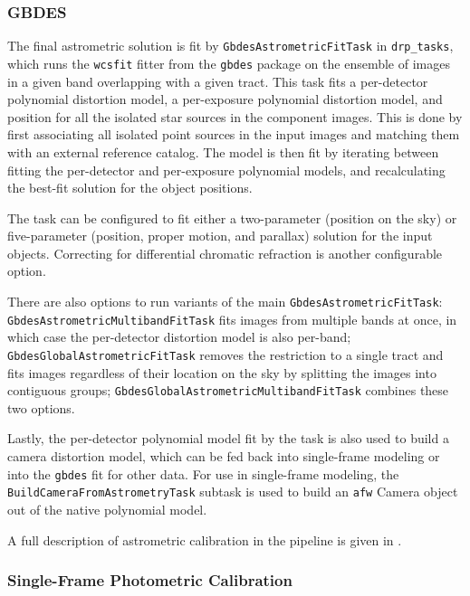 \subsubsection{GBDES}
\label{sec:gbdes}

The final astrometric solution is fit by \texttt{GbdesAstrometricFitTask} in \texttt{drp\_tasks}, which runs the \texttt{wcsfit} fitter from the \texttt{gbdes} package \citep{2022ascl.soft10011B,2017PASP..129g4503B} on the ensemble of images in a given band overlapping with a given tract.
This task fits a per-detector polynomial distortion model, a per-exposure polynomial distortion model, and position for all the isolated star sources in the component images.
This is done by first associating all isolated point sources in the input images and matching them with an external reference catalog.
The model is then fit by iterating between fitting the per-detector and per-exposure polynomial models, and recalculating the best-fit solution for the object positions.

The task can be configured to fit either a two-parameter (position on the sky) or five-parameter (position, proper motion, and parallax) solution for the input objects.
Correcting for differential chromatic refraction is another configurable option.

There are also options to run variants of the main \texttt{GbdesAstrometricFitTask}: \texttt{GbdesAstrometricMultibandFitTask} fits images from multiple bands at once, in which case the per-detector distortion model is also per-band; \texttt{GbdesGlobalAstrometricFitTask} removes the restriction to a single tract and fits images regardless of their location on the sky by splitting the images into contiguous groups; \texttt{GbdesGlobalAstrometricMultibandFitTask} combines these two options.

Lastly, the per-detector polynomial model fit by the task is also used to build a camera distortion model, which can be fed back into single-frame modeling or into the \texttt{gbdes} fit for other data.
For use in single-frame modeling, the \texttt{BuildCameraFromAstrometryTask} subtask is used to build an \texttt{afw} Camera object out of the native polynomial model.

A full description of astrometric calibration in the pipeline is given in \citet{DMTN-266}.

\subsubsection{Single-Frame Photometric Calibration}
\label{sec:photoCal}

